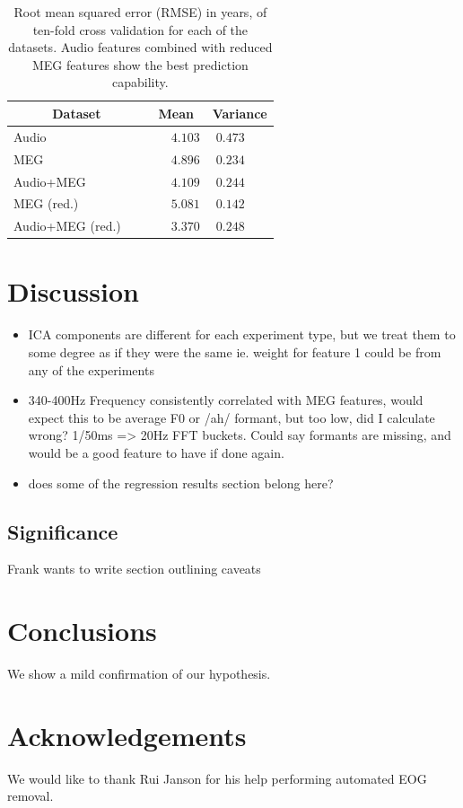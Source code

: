 \documentclass[a4paper]{article}
\begin{document}
\begin{table}[t]
  \caption{Root mean squared error (RMSE) in years, of ten-fold cross validation for each of the datasets. Audio features combined with reduced MEG features show the best prediction capability.}
  \label{tab:rmse}
  \centering
  \begin{tabular}{ l@{}c  c }
    \toprule
    \multicolumn{1}{c}{\textbf{Dataset}} & \multicolumn{1}{c}{\textbf{Mean}} & \multicolumn{1}{c}{\textbf{Variance}} \\
    \midrule
    Audio~~~                             & ~~~$4.103$         &     $0.473$~~~       \\
    MEG~~~                               & ~~~$4.896$         &     $0.234$~~~       \\
    Audio+MEG~~~                         & ~~~$4.109$         &     $0.244$~~~       \\

    MEG (red.)~~~                        & ~~~$5.081$         &     $0.142$~~~       \\
    Audio+MEG (red.)~~~                  & ~~~$3.370$         &     $0.248$~~~       \\
    \bottomrule
  \end{tabular}
\end{table}

\section{Discussion}

\begin{itemize}
\item ICA components are different for each experiment type, but we treat them to some degree as if they were the same ie. weight for feature 1 could be from any of the experiments
\item 340-400Hz Frequency consistently correlated with MEG features, would expect this to be average F0 or /ah/ formant, but too low, did I calculate wrong? 1/50ms => 20Hz FFT buckets. Could say formants are missing, and would be a good feature to have if done again.
\item does some of the regression results section belong here?
\end{itemize}

\subsection{Significance}

Frank wants to write section outlining caveats

\section{Conclusions}

We show a mild confirmation of our hypothesis.

\section{Acknowledgements}

We would like to thank Rui Janson for his help performing automated EOG removal.





\end{document}
